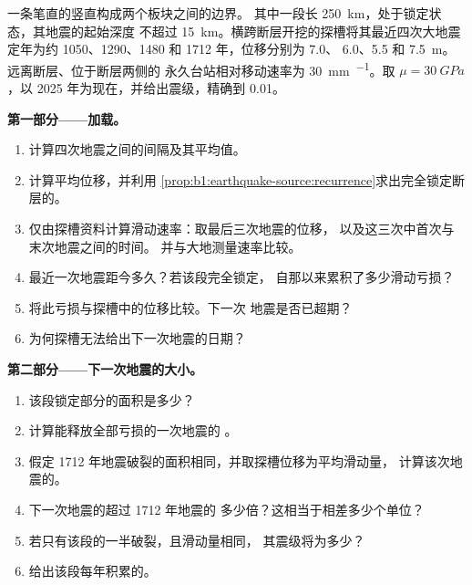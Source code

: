 \begin{problem}
\label{pb:b1:earthquake-source:1}
一条笔直的竖直构成两个板块之间的边界。
其中一段长 \qty{250}{km}，处于锁定状态，其地震的起始深度
不超过 \qty{15}{km}。横跨断层开挖的探槽将其最近四次大地震
定年为约 1050、1290、1480 和 1712 年，位移分别为 \num{7.0}、
\num{6.0}、\num{5.5} 和 \qty{7.5}{m}。远离断层、位于断层两侧的
永久台站相对移动速率为 \qty{30}{mm.^{-1}}。取 $\mu =
\qty{30}{GPa}$，以 2025 年为现在，并给出震级，精确到 0.01。

\medskip
\noindent\textbf{第一部分——加载。}
\begin{enumerate}
  \item 计算四次地震之间的间隔及其平均值。
  \item 计算平均位移，并利用
        \cref{prop:b1:earthquake-source:recurrence}求出完全锁定断层的。
  \item 仅由探槽资料计算滑动速率：取最后三次地震的位移，
        以及这三次中首次与末次地震之间的时间。
        并与大地测量速率比较。
  \item 最近一次地震距今多久？若该段完全锁定，
        自那以来累积了多少滑动亏损？
  \item 将此亏损与探槽中的位移比较。下一次
        地震是否已超期？
  \item 为何探槽无法给出下一次地震的日期？
\end{enumerate}

\medskip
\noindent\textbf{第二部分——下一次地震的大小。}
\begin{enumerate}[resume]
  \item 该段锁定部分的面积是多少？
  \item 计算能释放全部亏损的一次地震的
        。
  \item 假定 1712 年地震破裂的面积相同，并取探槽位移为平均滑动量，
        计算该次地震的。
  \item 下一次地震的超过 1712 年地震的
        多少倍？这相当于相差多少个单位？
  \item 若只有该段的一半破裂，且滑动量相同，
        其震级将为多少？
  \item 给出该段每年积累的。
\end{enumerate}


\end{problem}
